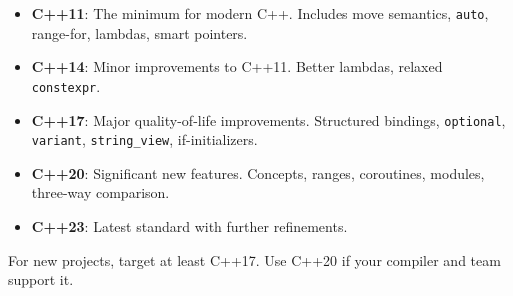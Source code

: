 \begin{itemize}
	\item \textbf{C++11}: The minimum for modern C++. Includes move semantics, \texttt{auto}, range-for, lambdas, smart pointers.
	\item \textbf{C++14}: Minor improvements to C++11. Better lambdas, relaxed \texttt{constexpr}.
	\item \textbf{C++17}: Major quality-of-life improvements. Structured bindings, \texttt{optional}, \texttt{variant}, \texttt{string\_view}, if-initializers.
	\item \textbf{C++20}: Significant new features. Concepts, ranges, coroutines, modules, three-way comparison.
	\item \textbf{C++23}: Latest standard with further refinements.
\end{itemize}

For new projects, target at least C++17. Use C++20 if your compiler and team support it.